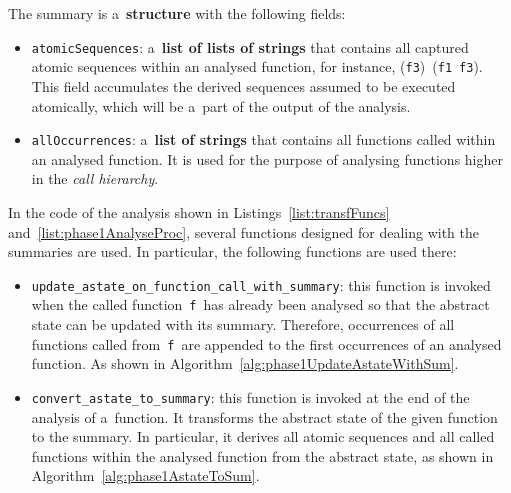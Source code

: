 The summary is a~\textbf{structure} with the following fields:
\begin{itemize}
    \item
        \texttt{atomicSequences}: a~\textbf{list of lists of strings}
        that contains all captured atomic sequences within an analysed
        function, for instance, (\texttt{f3})~(\texttt{f1}~\texttt{f3}).
        This field accumulates the derived sequences assumed to be executed
        atomically, which will be a~part of the output of the analysis.

    \item
        \texttt{allOccurrences}: a~\textbf{list of strings} that contains
        all functions called within an analysed function. It is used for
        the purpose of analysing functions higher in the \emph{call
        hierarchy}.
\end{itemize}

\newpage
In the code of the analysis shown in Listings~\ref{list:transfFuncs}
and~\ref{list:phase1AnalyseProc}, several functions designed for dealing
with the summaries are used. In particular, the following functions are
used there:
\begin{itemize}
    \item
        \texttt{update\_astate\_on\_function\_call\_with\_summary}: this
        function is invoked when the called function~\texttt{f}~has already
        been analysed so that the abstract state can be updated with its
        summary. Therefore, occurrences of all functions called
        from~\texttt{f}~are appended to the first occurrences of an
        analysed function. As shown in
        Algorithm~\ref{alg:phase1UpdateAstateWithSum}.

    \item
        \texttt{convert\_astate\_to\_summary}: this function is invoked
        at the end of the analysis of a~function. It transforms the abstract
        state of the given function to the summary. In particular, it
        derives all atomic sequences and all called functions within the
        analysed function from the abstract state, as shown in
        Algorithm~\ref{alg:phase1AstateToSum}.
\end{itemize}

\begin{algorithm}[hbt]


    \caption{%
        Updating abstract state with the summary of a~called function
    }
    \label{alg:phase1UpdateAstateWithSum}
\end{algorithm}

